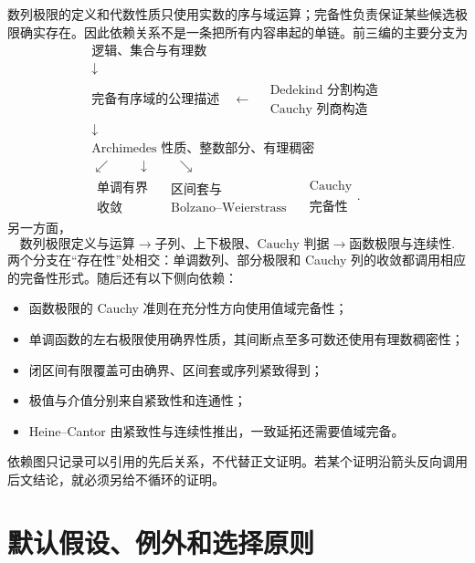 数列极限的定义和代数性质只使用实数的序与域运算；完备性负责保证某些候选极限确实存在。因此依赖关系不是一条把所有内容串起的单链。前三编的主要分支为
\[
\begin{array}{c}
\text{逻辑、集合与有理数}\\[2mm]
\downarrow\\[-1mm]
\text{完备有序域的公理描述}\quad\longleftarrow\quad
\begin{matrix}
\text{Dedekind 分割构造}\\
\text{Cauchy 列商构造}
\end{matrix}\\[3mm]
\downarrow\\[-1mm]
\text{Archimedes 性质、整数部分、有理稠密}\\[2mm]
\swarrow\qquad\downarrow\qquad\searrow\\[-1mm]
\begin{matrix}\text{单调有界}\\\text{收敛}\end{matrix}
\quad
\begin{matrix}\text{区间套与}\\\text{Bolzano--Weierstrass}\end{matrix}
\quad
\begin{matrix}\text{Cauchy}\\\text{完备性}\end{matrix}.
\end{array}
\]
另一方面，
\[
\text{数列极限定义与运算}
\longrightarrow
\text{子列、上下极限、Cauchy 判据}
\longrightarrow
\text{函数极限与连续性}.
\]
两个分支在“存在性”处相交：单调数列、部分极限和 Cauchy 列的收敛都调用相应的完备性形式。随后还有以下侧向依赖：
\begin{itemize}
 \item 函数极限的 Cauchy 准则在充分性方向使用值域完备性；
 \item 单调函数的左右极限使用确界性质，其间断点至多可数还使用有理数稠密性；
 \item 闭区间有限覆盖可由确界、区间套或序列紧致得到；
 \item 极值与介值分别来自紧致性和连通性；
 \item Heine--Cantor 由紧致性与连续性推出，一致延拓还需要值域完备。
\end{itemize}
依赖图只记录可以引用的先后关系，不代替正文证明。若某个证明沿箭头反向调用后文结论，就必须另给不循环的证明。

\section{默认假设、例外和选择原则}


